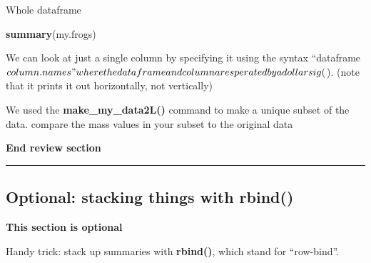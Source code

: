 \documentclass[]{book}
\newenvironment{Shaded}{\begin{snugshade}}{\end{snugshade}}
\newcommand{\KeywordTok}[1]{\textcolor[rgb]{0.13,0.29,0.53}{\textbf{#1}}}
\newcommand{\CommentTok}[1]{\textcolor[rgb]{0.56,0.35,0.01}{\textit{#1}}}
\newcommand{\OperatorTok}[1]{\textcolor[rgb]{0.81,0.36,0.00}{\textbf{#1}}}
\newcommand{\NormalTok}[1]{#1}
\theoremstyle{definition}
\theoremstyle{definition}
\theoremstyle{definition}
\theoremstyle{remark}
\begin{document}
Whole dataframe

\begin{Shaded}
\begin{Highlighting}[]
\KeywordTok{summary}\NormalTok{(my.frogs)}
\end{Highlighting}
\end{Shaded}

We can look at just a single column by specifying it using the syntax
``dataframe\(column.names" where the dataframe and column are sperated by a dollar sig (\)).
(note that it prints it out horizontally, not vertically)

\begin{Shaded}
\end{Shaded}

We used the \textbf{make\_my\_data2L()} command to make a unique subset
of the data. compare the mass values in your subset to the original data

\begin{Shaded}
\end{Shaded}

\textbf{End review section}

\begin{center}\rule{0.5\linewidth}{\linethickness}\end{center}

\subsection{Optional: stacking things with
rbind()}\label{optional-stacking-things-with-rbind}

\textbf{This section is optional}

Handy trick: stack up summaries with \textbf{rbind()}, which stand for
``row-bind''.

\begin{Shaded}
\end{Shaded}
\end{document}
